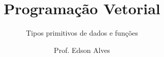 \title{Programação Vetorial}
\subtitle{Tipos primitivos de dados e funções}
\date{}
\author{Prof. Edson Alves}

